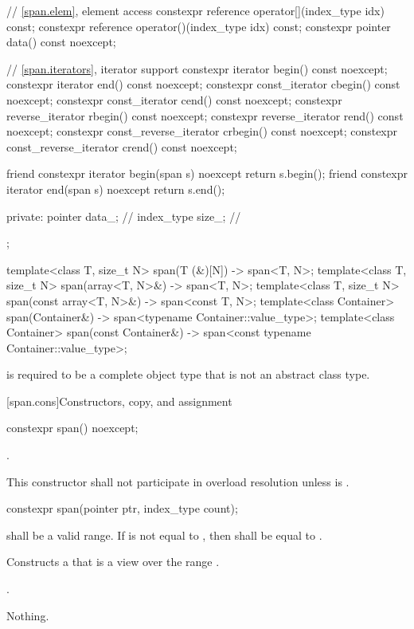 \begin{codeblock}
{{    // \ref{span.elem}, element access
    constexpr reference operator[](index_type idx) const;
    constexpr reference operator()(index_type idx) const;
    constexpr pointer data() const noexcept;

    // \ref{span.iterators}, iterator support
    constexpr iterator begin() const noexcept;
    constexpr iterator end() const noexcept;
    constexpr const_iterator cbegin() const noexcept;
    constexpr const_iterator cend() const noexcept;
    constexpr reverse_iterator rbegin() const noexcept;
    constexpr reverse_iterator rend() const noexcept;
    constexpr const_reverse_iterator crbegin() const noexcept;
    constexpr const_reverse_iterator crend() const noexcept;

    friend constexpr iterator begin(span s) noexcept { return s.begin(); }
    friend constexpr iterator end(span s) noexcept { return s.end(); }

  private:
    pointer data_;    // \expos
    index_type size_; // \expos
  };

  template<class T, size_t N>
    span(T (&)[N]) -> span<T, N>;
  template<class T, size_t N>
    span(array<T, N>&) -> span<T, N>;
  template<class T, size_t N>
    span(const array<T, N>&) -> span<const T, N>;
  template<class Container>
    span(Container&) -> span<typename Container::value_type>;
  template<class Container>
    span(const Container&) -> span<const typename Container::value_type>;
}
\end{codeblock}

\pnum
{} is required to be
a complete object type that is not an abstract class type.

[span.cons]{Constructors, copy, and assignment}

%
\begin{itemdecl}
constexpr span() noexcept;
\end{itemdecl}
\begin{itemdescr}
\pnum
\ensures
{}.

\pnum
\remarks
This constructor shall not participate in overload resolution
unless  is .
\end{itemdescr}

%
\begin{itemdecl}
constexpr span(pointer ptr, index_type count);
\end{itemdecl}
\begin{itemdescr}
\pnum
\requires {} shall be a valid range.
If  is not equal to ,
then  shall be equal to .

\pnum
\effects
Constructs a  that is a view over the range .

\pnum
\ensures
{}.

\pnum
\throws
Nothing.
\end{itemdescr}

